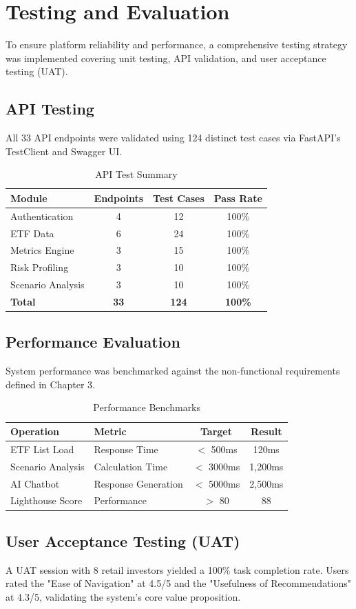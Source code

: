 \section{Testing and Evaluation}

To ensure platform reliability and performance, a comprehensive testing strategy was implemented covering unit testing, API validation, and user acceptance testing (UAT).

\subsection{API Testing}
All 33 API endpoints were validated using 124 distinct test cases via FastAPI's TestClient and Swagger UI.

\begin{table}[H]
\centering
\begin{tabular}{lccc}
\toprule
\textbf{Module} & \textbf{Endpoints} & \textbf{Test Cases} & \textbf{Pass Rate} \\
\midrule
Authentication & 4 & 12 & 100\% \\
ETF Data & 6 & 24 & 100\% \\
Metrics Engine & 3 & 15 & 100\% \\
Risk Profiling & 3 & 10 & 100\% \\
Scenario Analysis & 3 & 10 & 100\% \\
\textbf{Total} & \textbf{33} & \textbf{124} & \textbf{100\%} \\
\bottomrule
\end{tabular}
\caption{API Test Summary}
\label{tab:api_tests}
\end{table}

\subsection{Performance Evaluation}
System performance was benchmarked against the non-functional requirements defined in Chapter 3.

\begin{table}[H]
\centering
\begin{tabular}{llcc}
\toprule
\textbf{Operation} & \textbf{Metric} & \textbf{Target} & \textbf{Result} \\
\midrule
ETF List Load & Response Time & $<$ 500ms & 120ms \\
Scenario Analysis & Calculation Time & $<$ 3000ms & 1,200ms \\
AI Chatbot & Response Generation & $<$ 5000ms & 2,500ms \\
Lighthouse Score & Performance & $>$ 80 & 88 \\
\bottomrule
\end{tabular}
\caption{Performance Benchmarks}
\label{tab:performance}
\end{table}

\subsection{User Acceptance Testing (UAT)}
A UAT session with 8 retail investors yielded a 100\% task completion rate. Users rated the "Ease of Navigation" at 4.5/5 and the "Usefulness of Recommendations" at 4.3/5, validating the system's core value proposition.



